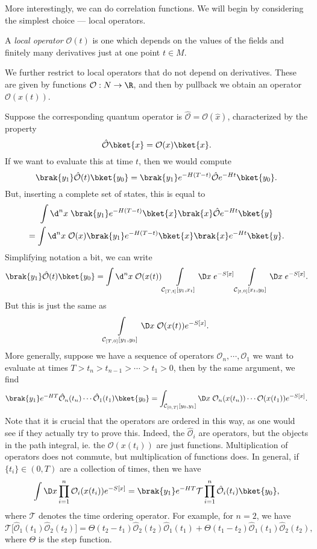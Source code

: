 \documentclass[a4paper]{article}
\begin{document}
More interestingly, we can do correlation functions. We will begin by considering the simplest choice --- local operators.
\begin{defi}
  A \emph{local operator} $\mathcal{O}(t)$ is one which depends on the values of the fields and finitely many derivatives just at one point $t \in M$.
\end{defi}
We further restrict to local operators that do not depend on derivatives. These are given by functions $\mathcal{O}: N \to \R$, and then by pullback we obtain an operator $\mathcal{O}(x(t))$.

Suppose the corresponding quantum operator is $\hat{\mathcal{O}} = \mathcal{O}(\hat{x})$, characterized by the property
\[
  \hat{\mathcal{O}}\bket{x} = \mathcal{O}(x) \bket{x}.
\]
If we want to evaluate this at time $t$, then we would compute
\[
  \brak{y_1} \hat{\mathcal{O}}(t) \bket{y_0} = \brak{y_1} e^{-H(T - t)} \hat{\mathcal{O}} e^{-Ht} \bket{y_0}.
\]
But, inserting a complete set of states, this is equal to
\begin{multline*}
  \int \d^n x\; \brak{y_1} e^{-H(T - t)}\bket{x} \brak{x}\hat{\mathcal{O}} e^{-Ht} \bket{y} \\
  = \int \d^n x\; \mathcal{O}(x) \brak{y_1} e^{-H(T - t)} \bket{x} \brak{x} e^{-Ht} \bket{y}.
\end{multline*}
Simplifying notation a bit, we can write
\[
  \brak{y_1} \hat{\mathcal{O}}(t) \bket{y_0} = \int \d^n x\; \mathcal{O}(x(t)) \int\limits_{\mathcal{C}_{[T, t]} [y_1, x_t]} \D x\; e^{-S[x]} \int\limits_{\mathcal{C}_{[t, 0]}[x_t, y_0]} \D x\; e^{-S[x]}.
\]
But this is just the same as
\[
  \int\limits_{\mathcal{C}_{[T, 0]}[y_1, y_0]} \D x\; \mathcal{O}(x(t)) e^{-S[x]}.
\]
More generally, suppose we have a sequence of operators $\mathcal{O}_n, \cdots, \mathcal{O}_1$ we want to evaluate at times $T > t_n > t_{n - 1} > \cdots > t_1 > 0$, then by the same argument, we find
\[
  \brak{y_1} e^{-HT}\hat{\mathcal{O}}_n(t_n)\cdots\hat{\mathcal{O}}_1(t_1) \bket{y_0} = \int_{\mathcal{C}_{[0, T]}[y_0, y_1]} \D x\; \mathcal{O}_n(x(t_n)) \cdots \mathcal{O}(x(t_1)) e^{-S[x]}.
\]
Note that it is crucial that the operators are ordered in this way, as one would see if they actually try to prove this. Indeed, the $\hat{\mathcal{O}}_i$ are operators, but the objects in the path integral, ie. the $\mathcal{O}(x(t_i))$ are just functions. Multiplication of operators does not commute, but multiplication of functions does. In general, if $\{t_i\} \in (0, T)$ are a collection of times, then we have
\[
  \int \D x \prod_{i = 1}^n \mathcal{O}_i(x(t_i)) e^{-S[x]} = \brak{y_1} e^{-HT}\mathcal{T} \prod_{i = 1}^n \hat{\mathcal{O}}_i(t_i) \bket{y_0},
\]
where $\mathcal{T}$ denotes the time ordering operator. For example, for $n = 2$, we have
\[
  \mathcal{T} \lbrack \hat{\mathcal{O}}_1(t_1) \hat{\mathcal{O}}_2(t_2)\rbrack = \Theta(t_2 - t_1) \hat{\mathcal{O}}_2(t_2) \hat{\mathcal{O}}_1(t_1) + \Theta(t_1 - t_2) \hat{\mathcal{O}}_1(t_1) \hat{\mathcal{O}}_2(t_2),
\]
where $\Theta$ is the step function.
\end{document}
